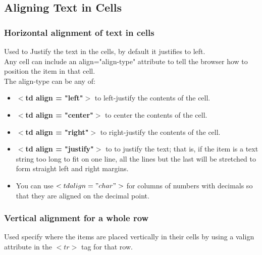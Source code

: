 \documentclass[11pt,a4paper]{article}
\begin{document}
\subsection*{Aligning Text in Cells}
\subsubsection*{Horizontal alignment of text in cells}
Used to Justify the text in the cells, by default it justifies to left.\\
Any cell can include an align="align-type" attribute to tell the browser how to position the item in that cell.\\


The align-type can be any of:
\begin{itemize}
\item  \textbf{$<$td align = "left"$>$} to left-justify the contents of the cell.
\item \textbf{$<$td align = "center"$>$} to center the contents of the cell.
\item \textbf{$<$td align = "right"$>$} to right-justify the contents of the cell.
\item \textbf{$<$td align = "justify"$>$} to to justify the text; that is, if the item is a text string too long to fit on one line, all the lines but the last will be stretched to form straight left and right margins.
\item You can use $<td align = "char">$ for columns of numbers with decimals so that they are aligned on the decimal point.
\end{itemize}
\subsubsection*{Vertical alignment for a whole row}
Used specify where the items are placed vertically in their cells by using a valign attribute in the $<tr>$ tag for that row. \
\end{document}
